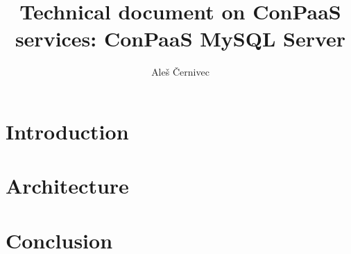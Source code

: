 \documentclass[a4paper,10pt]{article}
\begin{document}
\title{Technical document on ConPaaS services: ConPaaS MySQL Server}
\vspace{15pt}
\author{Ale{\v s} {\v C}ernivec}
\vspace{50pt}
\maketitle
\vspace{15pt}
\setlength{\parindent}{15pt}
\newpage
\tableofcontents
\newpage
\section{Introduction}

\section{Architecture}

\section{Conclusion}



\newpage
\vspace{4mm}
\end{document}
